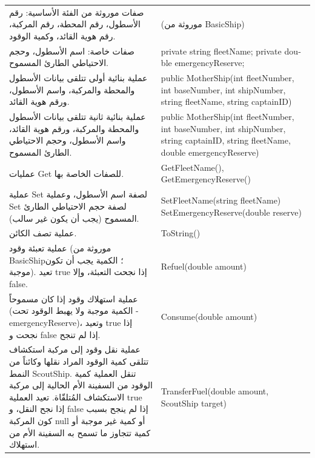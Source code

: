 \documentclass[14pt]{extarticle}
\begin{document}
\begin{enumerate}[label=\textbf{تمرين \arabic*:}, wide=0pt, leftmargin=*, itemsep=2.2em]
    {\centering
    \renewcommand{\arraystretch}{1.2}
    \small
    \begin{tabular}{|>{\raggedleft\arraybackslash}p{}|>{\raggedright\arraybackslash}p{}|}
    \hline
    \multicolumn{2}{|c|}{\textbf{الفئة الفرعية: \textenglish{MotherShip : BasicShip}}} \\
    \hline
    صفات موروثة من الفئة الأساسية: رقم الأسطول، رقم المحطة، رقم المركبة، رقم هوية القائد، وكمية الوقود. & \textenglish{(موروثة من BasicShip)} \\
    \hline
    صفات خاصة: اسم الأسطول، وحجم الاحتياطي الطارئ المسموح. & \textenglish{private string fleetName;} \newline \textenglish{private double emergencyReserve;} \\
    \hline
    عملية بنائية أولى تتلقى بيانات الأسطول والمحطة والمركبة، واسم الأسطول، ورقم هوية القائد. & \textenglish{public MotherShip(int fleetNumber, int baseNumber, int shipNumber, string fleetName, string captainID)} \\
    \hline
    عملية بنائية ثانية تتلقى بيانات الأسطول والمحطة والمركبة، ورقم هوية القائد، واسم الأسطول، وحجم الاحتياطي الطارئ المسموح. & \textenglish{public MotherShip(int fleetNumber, int baseNumber, int shipNumber, string captainID, string fleetName, double emergencyReserve)} \\
    \hline
    عمليات \textenglish{Get} للصفات الخاصة بها. & \textenglish{GetFleetName(), GetEmergencyReserve()} \\
    \hline
    عملية \textenglish{Set} لصفة اسم الأسطول، وعملية \textenglish{Set} لصفة حجم الاحتياطي الطارئ المسموح (يجب أن يكون غير سالب). & \textenglish{SetFleetName(string fleetName)} \newline \textenglish{SetEmergencyReserve(double reserve)} \\
    \hline
    عملية تصف الكائن. & \textenglish{ToString()} \\
    \hline
    عملية تعبئة وقود (موروثة من \textenglish{BasicShip}؛ الكمية يجب أن تكون موجبة). تعيد \textenglish{true} إذا نجحت التعبئة، وإلا \textenglish{false}. & \textenglish{Refuel(double amount)} \\
    \hline
    عملية استهلاك وقود إذا كان مسموحاً (الكمية موجبة ولا يهبط الوقود تحت \textenglish{-emergencyReserve})، وتعيد \textenglish{true} إذا نجحت و \textenglish{false} إذا لم تنجح. & \textenglish{Consume(double amount)} \\
    \hline
    عملية نقل وقود إلى مركبة استكشاف تتلقى كمية الوقود المراد نقلها وكائناً من النمط \textenglish{ScoutShip}. تنقل العملية كمية الوقود من السفينة الأم الحالية إلى مركبة الاستكشاف المُتلقّاة. تعيد العملية \textenglish{true} إذا نجح النقل، و \textenglish{false} إذا لم ينجح بسبب كون المركبة \textenglish{null} أو كمية غير موجبة أو كمية تتجاوز ما تسمح به السفينة الأم من استهلاك. & \textenglish{TransferFuel(double amount, ScoutShip target)} \\
    \hline
    \end{tabular}
    \par} %


\end{enumerate}
\end{document}
